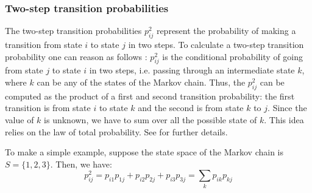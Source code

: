 \documentclass[\main/main.tex]{subfiles}
\begin{document}
\subsubsection{Two-step transition probabilities}

\noindent The two-step transition probabilities $p_{ij}^2$ represent the probability of making a transition from state $i$ to state $j$ in two steps. To calculate a two-step transition probability one can reason as follows \citep{Sheskin2010}: $p_{ij}^2$ is the conditional probability of going from state $j$ to state $i$ in two steps, i.e. passing through an intermediate state $k$, where $k$ can be any of the states of the Markov chain. Thus, the $p_{ij}^2$ can be computed as the product of a first and second transition probability: the first transition is from state $i$ to state $k$ and the second is from state $k$ to $j$. Since the value of $k$ is unknown, we have to sum over all the possible state of $k$. This idea relies on the law of total probability. See \cite{Zwillinger2000} for further details.

To make a simple example, suppose the state space of the Markov chain is $S = \{ 1,2,3\}$. Then, we have:
\begin{equation}
    p_{ij}^2 = p_{i1}p_{1j} + p_{i2}p_{2j} + p_{i3}p_{3j} = \sum_k p_{ik}p_{kj}
\end{equation}
\end{document}
